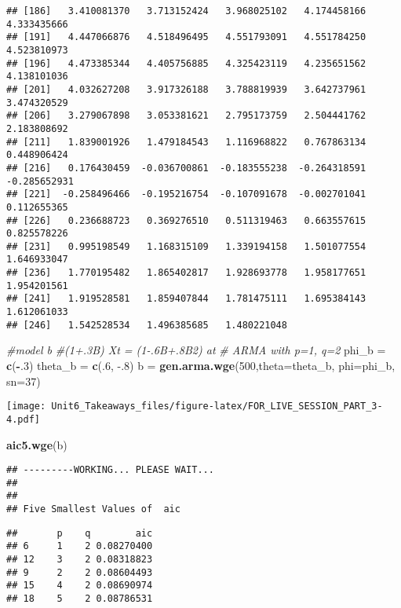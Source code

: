 \documentclass[]{article}
\newenvironment{Shaded}{\begin{snugshade}}{\end{snugshade}}
\newcommand{\CommentTok}[1]{\textcolor[rgb]{0.56,0.35,0.01}{\textit{#1}}}
\newcommand{\DataTypeTok}[1]{\textcolor[rgb]{0.13,0.29,0.53}{#1}}
\newcommand{\DecValTok}[1]{\textcolor[rgb]{0.00,0.00,0.81}{#1}}
\newcommand{\FloatTok}[1]{\textcolor[rgb]{0.00,0.00,0.81}{#1}}
\newcommand{\KeywordTok}[1]{\textcolor[rgb]{0.13,0.29,0.53}{\textbf{#1}}}
\newcommand{\NormalTok}[1]{#1}
\newcommand{\OperatorTok}[1]{\textcolor[rgb]{0.81,0.36,0.00}{\textbf{#1}}}
\newcommand{\StringTok}[1]{\textcolor[rgb]{0.31,0.60,0.02}{#1}}
\begin{document}
\begin{verbatim}
## [186]   3.410081370   3.713152424   3.968025102   4.174458166   4.333435666
## [191]   4.447066876   4.518496495   4.551793091   4.551784250   4.523810973
## [196]   4.473385344   4.405756885   4.325423119   4.235651562   4.138101036
## [201]   4.032627208   3.917326188   3.788819939   3.642737961   3.474320529
## [206]   3.279067898   3.053381621   2.795173759   2.504441762   2.183808692
## [211]   1.839001926   1.479184543   1.116968822   0.767863134   0.448906424
## [216]   0.176430459  -0.036700861  -0.183555238  -0.264318591  -0.285652931
## [221]  -0.258496466  -0.195216754  -0.107091678  -0.002701041   0.112655365
## [226]   0.236688723   0.369276510   0.511319463   0.663557615   0.825578226
## [231]   0.995198549   1.168315109   1.339194158   1.501077554   1.646933047
## [236]   1.770195482   1.865402817   1.928693778   1.958177651   1.954201561
## [241]   1.919528581   1.859407844   1.781475111   1.695384143   1.612061033
## [246]   1.542528534   1.496385685   1.480221048
\end{verbatim}

\begin{Shaded}
\begin{Highlighting}[]
\CommentTok{#model b}
\CommentTok{#(1+.3B) Xt = (1-.6B+.8B2) at}
\CommentTok{# ARMA with p=1, q=2}
\NormalTok{phi_b =}\StringTok{ }\KeywordTok{c}\NormalTok{(}\OperatorTok{-}\NormalTok{.}\DecValTok{3}\NormalTok{)}
\NormalTok{theta_b =}\StringTok{ }\KeywordTok{c}\NormalTok{(.}\DecValTok{6}\NormalTok{, }\FloatTok{-.8}\NormalTok{)}
\NormalTok{b =}\StringTok{ }\KeywordTok{gen.arma.wge}\NormalTok{(}\DecValTok{500}\NormalTok{,}\DataTypeTok{theta=}\NormalTok{theta_b, }\DataTypeTok{phi=}\NormalTok{phi_b,  }\DataTypeTok{sn=}\DecValTok{37}\NormalTok{)}
\end{Highlighting}
\end{Shaded}

\texttt{[image: Unit6\_Takeaways\_files/figure-latex/FOR\_LIVE\_SESSION\_PART\_3-4.pdf]}

\begin{Shaded}
\begin{Highlighting}[]
\KeywordTok{aic5.wge}\NormalTok{(b)}
\end{Highlighting}
\end{Shaded}

\begin{verbatim}
## ---------WORKING... PLEASE WAIT... 
## 
## 
## Five Smallest Values of  aic
\end{verbatim}

\begin{verbatim}
##       p    q        aic
## 6     1    2 0.08270400
## 12    3    2 0.08318823
## 9     2    2 0.08604493
## 15    4    2 0.08690974
## 18    5    2 0.08786531
\end{verbatim}
\end{document}
